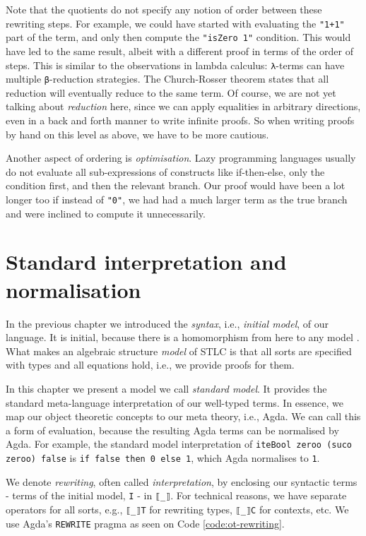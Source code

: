 Note that the quotients do not specify any notion of order between these rewriting steps. For example, we could have started with evaluating the \verb$"1+1"$ part of the term, and only then compute the \verb$"isZero 1"$ condition. This would have led to the same result, albeit with a different proof in terms of the order of steps. This is similar to the observations in lambda calculus: \verb$λ$-terms can have multiple \verb$β$-reduction strategies. The Church-Rosser theorem states that all reduction will eventually reduce to the same term. Of course, we are not yet talking about \textit{reduction} here, since we can apply equalities in arbitrary directions, even in a back and forth manner to write infinite proofs. So when writing proofs by hand on this level as above, we have to be more cautious.

Another aspect of ordering is \textit{optimisation}. Lazy programming languages usually do not evaluate all sub-expressions of constructs like if-then-else, only the condition first, and then the relevant branch. Our proof would have been a lot longer too if instead of \verb$"0"$, we had had a much larger term as the true branch and were inclined to compute it unnecessarily.

\section{Standard interpretation and normalisation} \label{sec:normalisation}

In the previous chapter we introduced the \textit{syntax}, i.e., \textit{initial model}, of our language. It is initial, because there is a homomorphism from here to any model \cite{typesystems-repo}. What makes an algebraic structure \textit{model} of STLC is that all sorts are specified with types and all equations hold, i.e., we provide proofs for them.

In this chapter we present a model we call \textit{standard model}. It provides the standard meta-language interpretation of our well-typed terms. In essence, we map our object theoretic concepts to our meta theory, i.e., Agda. We can call this a form of evaluation, because the resulting Agda terms can be normalised by Agda. For example, the standard model interpretation of \verb$iteBool zeroo (suco zeroo) false$ is \verb$if false then 0 else 1$, which Agda normalises to \verb$1$.

We denote \textit{rewriting}, often called \textit{interpretation}, by enclosing our syntactic terms - terms of the initial model, \verb$I$ - in \verb$⟦_⟧$. For technical reasons, we have separate operators for all sorts, e.g., \verb$⟦_⟧T$ for rewriting types, \verb$⟦_⟧C$ for contexts, etc. We use Agda's \verb$REWRITE$ pragma as seen on Code \ref{code:ot-rewriting}.

